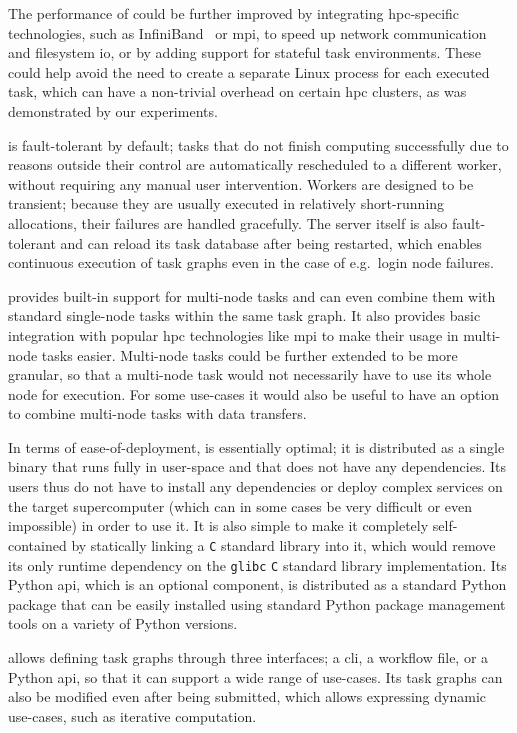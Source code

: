 \begin{description}[wide=0pt]
		The performance of \hyperqueue{} could be further improved by integrating
		\gls{hpc}-specific technologies, such as InfiniBand~\cite{infiniband} or
		\gls{mpi}, to speed up network communication and filesystem
		\gls{io}, or by adding support for stateful task environments. These could help
		avoid the need to create a separate Linux process for each executed task, which can have a
		non-trivial overhead on certain \gls{hpc} clusters, as was demonstrated by our
		experiments.
	\item[Fault tolerance] \hyperqueue{} is fault-tolerant by default; tasks that do not
		finish computing successfully due to reasons outside their control are automatically rescheduled to
		a different worker, without requiring any manual user intervention. Workers are designed to be
		transient; because they are usually executed in relatively short-running allocations, their
		failures are handled gracefully. The server itself is also fault-tolerant and can reload its task
		database after being restarted, which enables continuous execution of task graphs even in the case
		of e.g.\ login node failures.
	\item[Multi-node tasks] \hyperqueue{} provides built-in support for multi-node tasks and
		can even combine them with standard single-node tasks within the same task graph. It also provides
		basic integration with popular \gls{hpc} technologies like
		\gls{mpi} to make their usage in multi-node tasks easier. Multi-node tasks could
		be further extended to be more granular, so that a multi-node task would not necessarily have to
		use its whole node for execution. For some use-cases it would also be useful to have an
		option to combine multi-node tasks with data transfers.
	\item[Deployment] In terms of ease-of-deployment, \hyperqueue{} is essentially optimal; it is
		distributed as a single binary that runs fully in user-space and that does not have any
		dependencies. Its users thus do not have to install any dependencies or deploy complex services on
		the target supercomputer (which can in some cases be very difficult or even impossible) in order to
		use it. It is also simple to make it completely self-contained by statically linking a
		\texttt{C} standard library into it, which would remove its only runtime dependency
		on the \texttt{glibc} \texttt{C} standard library implementation. Its
		Python \gls{api}, which is an optional component, is distributed as a standard
		Python package that can be easily installed using standard Python package management tools on a
		variety of Python versions.
	\item[Programming model] \hyperqueue{} allows defining task graphs through three
		interfaces; a \gls{cli}, a workflow file, or a Python \gls{api},
		so that it can support a wide range of use-cases. Its task graphs can also be modified even after
		being submitted, which allows expressing dynamic use-cases, such as iterative computation.


\end{description}
